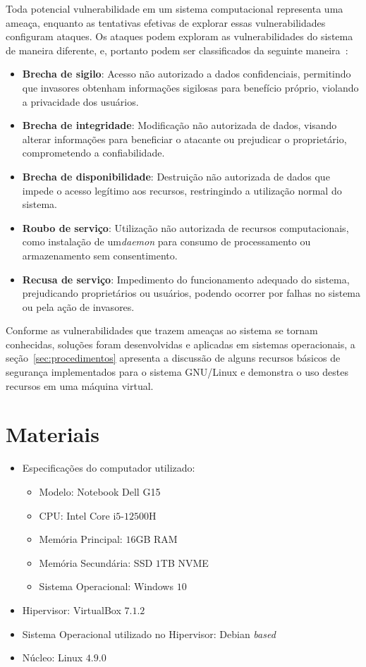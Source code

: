 \documentclass[
    12pt,				%
    oneside,   	        %
    a4paper,			%
    english,			%
    french,				%
    spanish,			%
    brazil,				%
    ]{pacotes/abntex2}
\begin{document}
Toda potencial vulnerabilidade em um sistema computacional representa uma ameaça, enquanto as tentativas efetivas de explorar essas vulnerabilidades configuram ataques. Os ataques podem exploram as vulnerabilidades do sistema de maneira diferente, e, portanto podem ser classificados da seguinte maneira~\cite{silberschatz2015}:

\begin{itemize}
    \item \textbf{Brecha de sigilo}: Acesso não autorizado a dados confidenciais, permitindo que invasores obtenham informações sigilosas para benefício próprio, violando a privacidade dos usuários.
    \item \textbf{Brecha de integridade}:  Modificação não autorizada de dados, visando alterar informações para beneficiar o atacante ou prejudicar o proprietário, comprometendo a confiabilidade.
    \item \textbf{Brecha de disponibilidade}: Destruição não autorizada de dados que impede o acesso legítimo aos recursos, restringindo a utilização normal do sistema.
    \item \textbf{Roubo de serviço}: Utilização não autorizada de recursos computacionais, como instalação de um\textit{daemon} para consumo de processamento ou armazenamento sem consentimento.
    \item \textbf{Recusa de serviço}: Impedimento do funcionamento adequado do sistema, prejudicando proprietários ou usuários, podendo ocorrer por falhas no sistema ou pela ação de invasores.
\end{itemize}

Conforme as vulnerabilidades que trazem ameaças ao sistema se tornam conhecidas, soluções foram desenvolvidas e aplicadas em sistemas operacionais, a seção~\ref{sec:procedimentos} apresenta a discussão de alguns recursos básicos de segurança implementados para o sistema GNU/Linux e demonstra o uso destes recursos em uma máquina virtual.

\section{Materiais}
\label{sec:materiais}

\begin{itemize}
  \item Especificações do computador utilizado:
  \begin{itemize}
    \item Modelo: Notebook Dell G15
    \item CPU: Intel Core i$5$-$12500$H
    \item Memória Principal: $16$GB RAM
    \item Memória Secundária: SSD $1$TB NVME
    \item Sistema Operacional: Windows $10$
  \end{itemize}
  \item Hipervisor: VirtualBox $7.1.2$
  \item Sistema Operacional utilizado no Hipervisor: Debian \textit{based}
  \item Núcleo: Linux $4.9.0$ 
\end{itemize}
\end{document}

